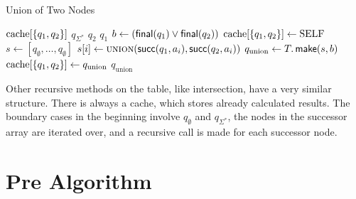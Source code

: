 \begin{algorithm}
\caption{Union of Two Nodes}\label{alg:union}
\begin{algorithmic}[1]
\If{$\cache[\{q_{1},q_{2}\}]$}
	\Return $\cache[\{q_{1},q_{2}\}]$
	\Return $q_{\Sigma^{*}}$
	\Return $q_{2}$
	\Return $q_{1}$
\EndIf
\State $b \gets (\operatorname{\textsf{final}}(q_{1}) \lor \operatorname{\textsf{final}}(q_{2}))$
\State $\mathrm{cache}[\{q_{1},q_{2}\}] \gets \text{SELF}$
\State $s \gets [q_{\emptyset},\dots,q_{\emptyset}]$
\State $s[i] \gets \Call{union}{\Succ(q_{1},a_{i}),\Succ(q_{2},a_{i})}$
\EndFor
\State $q_{\text{union}} \gets T.\operatorname{\textsf{make}}(s,b)$
\State $\mathrm{cache}[\{q_{1},q_{2}\}] \gets q_{\text{union}}$
\Return $q_{\text{union}}$
\EndProcedure
\end{algorithmic}
\end{algorithm}

Other recursive methods on the table, like intersection, have a very similar structure. There is always a cache, which stores already calculated results. The boundary cases in the beginning involve $q_{\emptyset}$ and $q_{\Sigma^{*}}$, the nodes in the successor array are iterated over, and a recursive call is made for each successor node. 


\section{Pre Algorithm}

